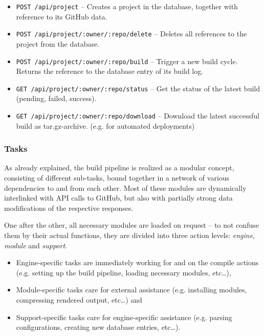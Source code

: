 \begin{itemize}
  \item \texttt{POST /api/project} -- Creates a project in the database, together with reference to its GitHub data.
  \item \texttt{POST /api/project/:owner/:repo/delete} -- Deletes all references to the project from the database.
  \item \texttt{POST /api/project/:owner/:repo/build} -- Trigger a new build cycle. Returns the reference to the database entry of its build log.
  \item \texttt{GET /api/project/:owner/:repo/status} -- Get the status of the latest build (pending, failed, success).
  \item \texttt{GET /api/project/:owner/:repo/download} -- Download the latest successful build as tar.gz-archive. (e.g. for automated deployments)
\end{itemize}

\subsubsection{Tasks}
As already explained, the build pipeline is realized as a modular concept, consisting of different sub-tasks, bound together in a network of various dependencies to and from each other. Most of these modules are dynamically interlinked with API calls to GitHub, but also with partially strong data modifications of the respective responses.

One after the other, all necessary modules are loaded on request -- to not confuse them by their actual functions, they are divided into three action levels: \emph{engine}, \emph{module} and \emph{support}.

\begin{itemize}
  \item Engine-specific tasks are immediately working for and on the compile actions (e.g. setting up the build pipeline, loading necessary modules, etc\ldots),
  \item Module-specific tasks care for external assistance (e.g. installing modules, compressing rendered output, etc\ldots) and
  \item Support-specific tasks care for engine-specific assistance (e.g. parsing configurations, creating new database entries, etc\ldots).
\end{itemize}
